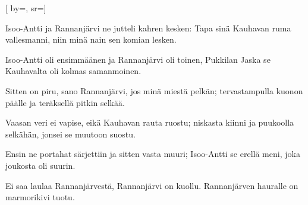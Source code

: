
[
	by={},
	sr={}]

\beginverse*
Isoo-Antti ja Rannanjärvi
ne jutteli kahren kesken:
Tapa sinä Kauhavan ruma vallesmanni,
niin minä nain sen komian lesken.
\endverse

\beginverse*
Isoo-Antti oli ensimmäänen
ja Rannanjärvi oli toinen,
Pukkilan Jaska se Kauhavalta
oli kolmas samanmoinen.
\endverse

\beginverse*
Sitten on piru, sano Rannanjärvi,
jos minä miestä pelkän;
tervastampulla kuonon päälle
ja teräksellä pitkin selkää.
\endverse

\beginverse*
Vaasan veri ei vapise,
eikä Kauhavan rauta ruostu;
niskasta kiinni ja puukoolla selkähän,
jonsei se muutoon suostu.
\endverse

\beginverse*
Ensin ne portahat särjettiin
ja sitten vasta muuri;
Isoo-Antti se erellä meni,
joka joukosta oli suurin.
\endverse

\beginverse*
Ei saa laulaa Rannanjärvestä,
Rannanjärvi on kuollu.
Rannanjärven hauralle
on marmorikivi tuotu.
\endverse
\endsong